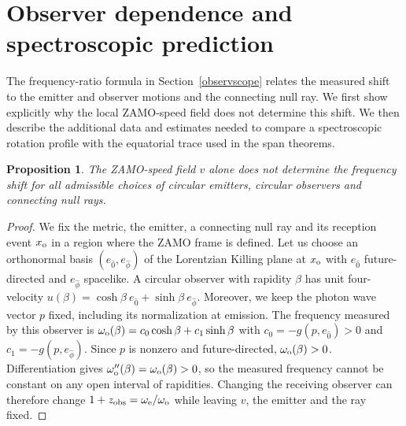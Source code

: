 \documentclass[amsmath,amsfonts,amssymb,aps,pra,superscriptaddress,10pt]{revtex4-2}
\numberwithin{equation}{section}
\theoremstyle{plain}
\newtheorem{proposition}{Proposition}
\theoremstyle{definition}
\theoremstyle{remark}
\theoremstyle{definition}
\begin{document}
\section{Observer dependence and spectroscopic prediction}
\label{appobserv}

The frequency-ratio formula in Section~\ref{observscope} relates the measured shift to the emitter and observer motions and the connecting null ray. We first show explicitly why the local ZAMO-speed field does not determine this shift. We then describe the additional data and estimates needed to compare a spectroscopic rotation profile with the equatorial trace used in the span theorems.

\begin{proposition}
The ZAMO-speed field $v$ alone does not determine the frequency shift for all admissible choices of circular emitters, circular observers and connecting null rays.
\end{proposition}

\begin{proof}
We fix the metric, the emitter, a connecting null ray and its reception event $x_{\rm{o}}$ in a region where the ZAMO frame is defined. Let us choose an orthonormal basis $(e_{\hat{0}},e_{\hat{\phi}})$ of the Lorentzian Killing plane at $x_{\rm{o}}$ with $e_{\hat{0}}$ future-directed and $e_{\hat{\phi}}$ spacelike. A circular observer with rapidity $\beta$ has unit four-velocity $u(\beta)=\cosh{\beta}~e_{\hat{0}}+\sinh{\beta}~e_{\hat{\phi}}$. Moreover, we keep the photon wave vector $p$ fixed, including its normalization at emission. The frequency measured by this observer is
$\omega_{\rm{o}}(\beta)=c_0\cosh{\beta}+c_1\sinh{\beta}$ with $c_0=-g(p,e_{\hat{0}})>0$ and $c_1=-g(p,e_{\hat{\phi}})$. Since $p$ is nonzero and future-directed, $\omega_{\rm{o}}(\beta)>0$. Differentiation gives $\omega_{\rm{o}}''(\beta)=\omega_{\rm{o}}(\beta)>0$, so the measured frequency cannot be constant on any open interval of rapidities. Changing the receiving observer can therefore change $1+z_{\rm{obs}}=\omega_{\rm{e}}/\omega_{\rm{o}}$ while leaving $v$, the emitter and the ray fixed.
\end{proof}
\end{document}

